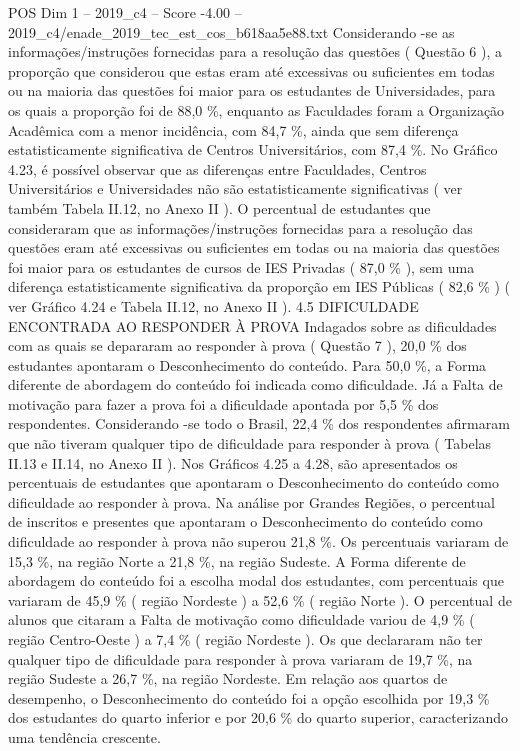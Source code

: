 \begin{textsample}{POS Dim 1 – 2019\_c4 – Score -4.00 – 2019\_c4/enade\_2019\_tec\_est\_cos\_b618aa5e88.txt}
Considerando -se as informações/instruções fornecidas para a resolução das questões ( Questão 6 ), a proporção que considerou que estas eram até excessivas ou suficientes em todas ou na maioria das questões foi maior para os estudantes de Universidades, para os quais a proporção foi de 88,0 \%, enquanto as Faculdades foram a Organização Acadêmica com a menor incidência, com 84,7 \%, ainda que sem diferença estatisticamente significativa de Centros Universitários, com 87,4 \%.
No Gráfico 4.23, é possível observar que as diferenças entre Faculdades, Centros Universitários e Universidades não são estatisticamente significativas ( ver também Tabela II.12, no Anexo II ).
O percentual de estudantes que consideraram que as informações/instruções fornecidas para a resolução das questões eram até excessivas ou suficientes em todas ou na maioria das questões foi maior para os estudantes de cursos de IES Privadas ( 87,0 \% ), sem uma diferença estatisticamente significativa da proporção em IES Públicas ( 82,6 \% ) ( ver Gráfico 4.24 e Tabela II.12, no Anexo II ). 4.5 DIFICULDADE ENCONTRADA AO RESPONDER À PROVA Indagados sobre as dificuldades com as quais se depararam ao responder à prova ( Questão 7 ), 20,0 \% dos estudantes apontaram o Desconhecimento do conteúdo.
Para 50,0 \%, a Forma diferente de abordagem do conteúdo foi indicada como dificuldade.
Já a Falta de motivação para fazer a prova foi a dificuldade apontada por 5,5 \% dos respondentes.
Considerando -se todo o Brasil, 22,4 \% dos respondentes afirmaram que não tiveram qualquer tipo de dificuldade para responder à prova ( Tabelas II.13 e II.14, no Anexo II ).
Nos Gráficos 4.25 a 4.28, são apresentados os percentuais de estudantes que apontaram o Desconhecimento do conteúdo como dificuldade ao responder à prova.
Na análise por Grandes Regiões, o percentual de inscritos e presentes que apontaram o Desconhecimento do conteúdo como dificuldade ao responder à prova não superou 21,8 \%.
Os percentuais variaram de 15,3 \%, na região Norte a 21,8 \%, na região Sudeste.
A Forma diferente de abordagem do conteúdo foi a escolha modal dos estudantes, com percentuais que variaram de 45,9 \% ( região Nordeste ) a 52,6 \% ( região Norte ).
O percentual de alunos que citaram a Falta de motivação como dificuldade variou de 4,9 \% ( região Centro-Oeste ) a 7,4 \% ( região Nordeste ).
Os que declararam não ter qualquer tipo de dificuldade para responder à prova variaram de 19,7 \%, na região Sudeste a 26,7 \%, na região Nordeste.
Em relação aos quartos de desempenho, o Desconhecimento do conteúdo foi a opção escolhida por 19,3 \% dos estudantes do quarto inferior e por 20,6 \% do quarto superior, caracterizando uma tendência crescente.

\end{textsample}
